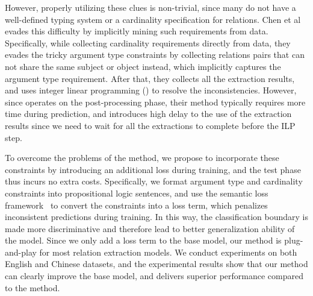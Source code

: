 However, properly utilizing these clues is non-trivial, since many \KBs do not have a well-defined typing system or a cardinality specification for relations.
Chen et al~ evades this difficulty by implicitly mining such requirements from data.
Specifically, while collecting cardinality requirements directly from data, they evades the tricky argument type constraints by collecting relations pairs that can not share the same subject or object instead, which implicitly captures the argument type requirement.
After that, they collects all the extraction results, and uses integer linear programming (\ILP) to resolve the inconsistencies.
However, since \ILP operates on the post-processing phase, their method typically requires more time during prediction, and introduces high delay to the use of the extraction results since we need to wait for all the extractions to complete before the ILP step.

To overcome the problems of the \ILP method, we propose to incorporate these constraints by introducing an additional loss during training, and the test phase thus incurs no extra costs.
Specifically, we format argument type and cardinality constraints into propositional logic sentences, and use the semantic loss framework~\cite{xu2017semantic} to convert the constraints into a loss term, which penalizes inconsistent predictions during training.
In this way, the classification boundary is made more discriminative and therefore lead to better generalization ability of the model.
Since we only add a loss term to the base model, our method is plug-and-play for most relation extraction models.
We conduct experiments on both English and Chinese datasets,
and the experimental results show that our method can clearly improve the base model, and delivers superior performance compared to the \ILP method.


